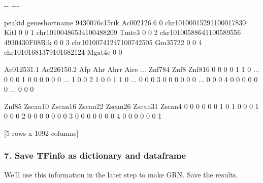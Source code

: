 \documentclass[letterpaper,10pt,english]{sphinxmanual}
\newlength\nbsphinxcodecellspacing
\begin{document}
{

\kern-\sphinxverbatimsmallskipamount\kern-\baselineskip
\kern+\FrameHeightAdjust\kern-\fboxrule
\vspace{\nbsphinxcodecellspacing}

%
\begin{sphinxVerbatim}[commandchars=\\\{\}]
\llap{\color{nbsphinxout}[20]:\,\hspace{\fboxrule}\hspace{\fboxsep}}                     peak\PYGZus{}id gene\PYGZus{}short\PYGZus{}name  9430076c15rik  Ac002126.6  \PYGZbs{}
0  chr10\PYGZus{}100015291\PYGZus{}100017830            Kitl              0           0
1  chr10\PYGZus{}100486534\PYGZus{}100488209           Tmtc3              0           0
2  chr10\PYGZus{}100588641\PYGZus{}100589556   4930430F08Rik              0           0
3  chr10\PYGZus{}100741247\PYGZus{}100742505         Gm35722              0           0
4  chr10\PYGZus{}101681379\PYGZus{}101682124          Mgat4c              0           0

   Ac012531.1  Ac226150.2  Afp  Ahr  Ahrr  Aire  ...  Znf784  Znf8  Znf816  \PYGZbs{}
0           0           0    0    1     1     0  ...       0     0       0
1           0           0    0    0     0     0  ...       1     0       0
2           1           0    0    1     1     0  ...       0     0       0
3           0           0    0    0     0     0  ...       0     0       0
4           0           0    0    0     0     0  ...       0     0       0

   Znf85  Zscan10  Zscan16  Zscan22  Zscan26  Zscan31  Zscan4
0      0        0        0        0        0        1       0
1      0        0        0        1        0        0       0
2      0        0        0        0        0        0       0
3      0        0        0        0        0        0       0
4      0        0        0        0        0        0       1

[5 rows x 1092 columns]
\end{sphinxVerbatim}
}


\subsubsection{7. Save TFinfo as dictionary and dataframe}
\label{\detokenize{notebooks/02_motif_scan/02_atac_peaks_to_TFinfo_with_celloracle_190901:7.-Save-TFinfo-as-dictionary-and-dataframe}}
We’ll use this information in the later step to make GRN. Save the results.
\end{document}
